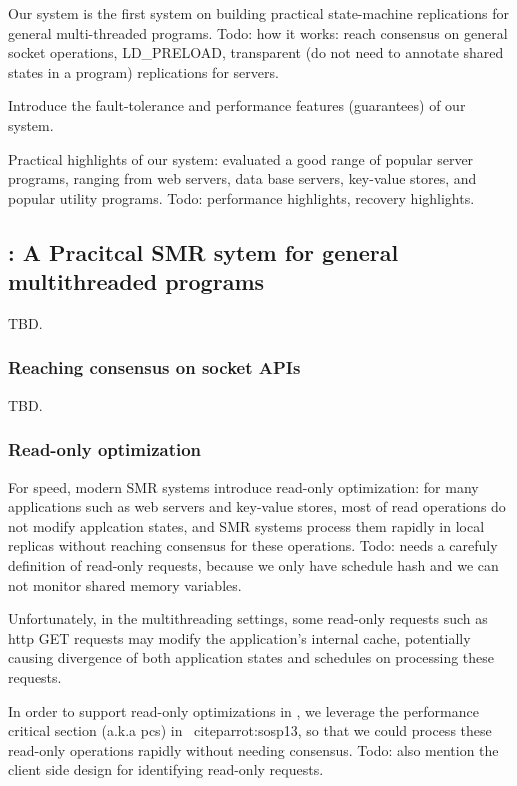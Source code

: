 Our system is the first system on building practical state-machine 
replications for general multi-threaded programs. Todo: how it works: reach 
consensus on general socket operations, LD\_PRELOAD, transparent (do not need 
to annotate shared states in a program) replications for servers.

Introduce the fault-tolerance and performance features (guarantees) of our 
system.

Practical highlights of our system: evaluated a good range of popular server 
programs, ranging from web servers, data base servers, key-value stores, and 
popular utility programs. Todo: performance highlights, recovery highlights.

\subsection{\msmr: A Pracitcal SMR sytem for general multithreaded programs} \label{sec:replication-msmr}
TBD.

\subsubsection{Reaching consensus on socket APIs} \label{sec:replication-msmr-consensus}
TBD.

\subsubsection{Read-only optimization} \label{sec:replication-msmr-readonly}
For speed, modern SMR systems introduce read-only optimization: for many applications such as web servers and key-value stores,
 most of read operations do not modify applcation states, and SMR systems process them rapidly in 
local replicas without reaching consensus for these operations. Todo: needs a 
carefuly definition of read-only requests, because we only have schedule hash 
and we can not monitor shared memory variables.

Unfortunately, in the multithreading settings, some read-only requests such as http GET requests may
modify the application's internal cache, potentially causing divergence of both application states and 
schedules on processing these requests.

In order to support read-only optimizations in \msmr, we leverage the performance critical 
section (a.k.a pcs) in \parrot~cite{parrot:sosp13}, so that we could process 
these read-only operations rapidly without needing consensus. Todo: also 
mention the client side design for identifying read-only requests.

